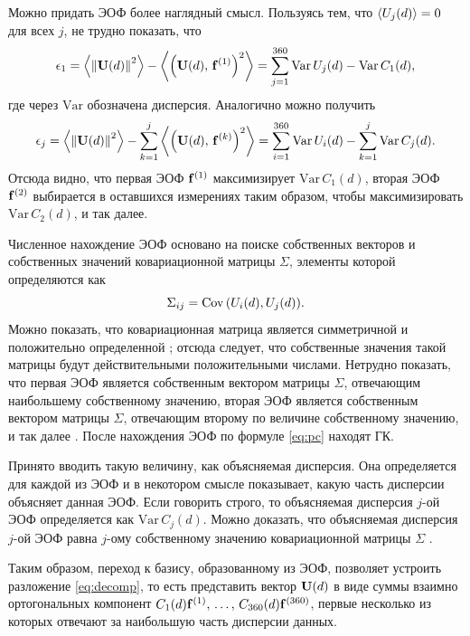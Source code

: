 Можно придать ЭОФ более наглядный смысл. Пользуясь тем, что $\expval{U_j(d)}=0$ для всех $j$, не трудно показать, что
\begin{equation}
    \epsilon_1 = \expval{\norm{\vb{U}(d)}^2} - \expval{\qty(\vb{U}(d),\, \vb{f}^{(1)})^2} = \sum\limits_{j=1}^{360} \mathrm{Var}\, U_j(d) - \mathrm{Var}\, C_1(d),
\end{equation}
где через $\mathrm{Var}$ обозначена дисперсия. Аналогично можно получить
\begin{equation}
    \epsilon_j = \expval{\norm{\vb{U}(d)}^2} - \sum\limits_{k=1}^{j} \expval{\qty(\vb{U}(d),\, \vb{f}^{(k)})^2} = \sum\limits_{i=1}^{360} \mathrm{Var}\, U_i(d) - \sum\limits_{k=1}^{j}\mathrm{Var}\, C_j(d).
\end{equation}
Отсюда видно, что первая ЭОФ $\vb{f}^{(1)}$ максимизирует $\mathrm{Var}\, C_1(d)$, вторая ЭОФ $\vb{f}^{(2)}$ выбирается в оставшихся измерениях таким образом, чтобы максимизировать $\mathrm{Var}\, C_2(d)$, и так далее.

Численное нахождение ЭОФ основано на поиске собственных векторов и собственных значений ковариационной матрицы $\Sigma$, элементы которой определяются как
\begin{equation}
    \Sigma_{ij} = \mathrm{Cov}\, \qty(U_i(d), U_j(d)).
\end{equation}
Можно показать, что ковариационная матрица является симметричной и положительно определенной \cite[Утв. 6.1]{Zhang_Moore_2015}; отсюда следует, что собственные значения такой матрицы будут действительными положительными числами. Нетрудно показать, что первая ЭОФ является собственным вектором матрицы $\Sigma$, отвечающим наибольшему собственному значению, вторая ЭОФ является собственным вектором матрицы $\Sigma$, отвечающим второму по величине собственному значению, и так далее \cite[Tеор. 6.1 и 6.3]{Zhang_Moore_2015}. После нахождения ЭОФ по формуле \eqref{eq:pc} находят ГК.

Принято вводить такую величину, как объясняемая дисперсия. Она определяется для каждой из ЭОФ и в некотором смысле показывает, какую часть дисперсии объясняет данная ЭОФ. Если говорить строго, то объясняемая дисперсия $j$-ой ЭОФ определяется как $\mathrm{Var}\, C_j(d)$. Можно доказать, что объясняемая дисперсия $j$-ой ЭОФ равна $j$-ому собственному значению ковариационной матрицы $\Sigma$ \cite[Утв. 6.2]{Zhang_Moore_2015}.

Таким образом, переход к базису, образованному из ЭОФ, позволяет устроить разложение \eqref{eq:decomp}, то есть представить вектор $\vb{U}(d)$ в виде суммы взаимно ортогональных компонент $C_1(d)\vb{f}^{(1)},\, \ldots,\, C_{360}(d) \vb{f}^{(360)}$, первые несколько из которых отвечают за наибольшую часть дисперсии данных.

